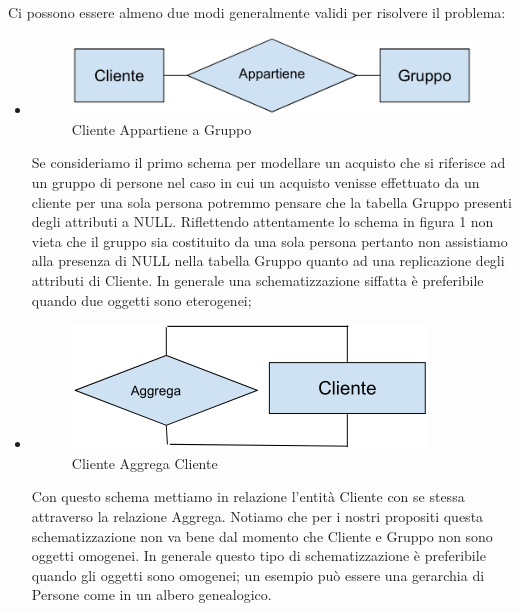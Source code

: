 Ci possono essere almeno due modi generalmente validi per risolvere il problema:   

\begin{itemize}

\item{}

\begin{center}
\begin{figure}[H]
\centering
\includegraphics[scale=1]{figures/cliente_appartiene_gruppo.png}
\caption{Cliente Appartiene a Gruppo}
\end{figure}
\end{center}

Se consideriamo il primo schema per modellare un acquisto che si riferisce ad un gruppo di persone nel caso in cui un acquisto venisse effettuato da un cliente per una sola persona potremmo pensare che la tabella Gruppo presenti degli attributi a NULL. Riflettendo attentamente lo schema in figura 1 non vieta che il gruppo sia costituito da una sola persona pertanto non assistiamo alla presenza di NULL nella tabella Gruppo quanto ad una replicazione degli attributi di Cliente. In generale una schematizzazione siffatta è preferibile quando due oggetti sono eterogenei;

\item{}

\begin{center}
\begin{figure}[H]
\centering
\includegraphics[scale=1]{figures/cliente_aggrega_cliente.png}
\caption{Cliente Aggrega Cliente}
\end{figure}
\end{center}

Con questo schema mettiamo in relazione l’entità Cliente con se stessa attraverso la relazione Aggrega. Notiamo che per i nostri propositi questa schematizzazione non va bene dal momento che Cliente e Gruppo non sono oggetti omogenei. In generale questo tipo di schematizzazione è preferibile quando gli oggetti sono omogenei; un esempio può essere una gerarchia di Persone come in un albero genealogico.

\end{itemize}



